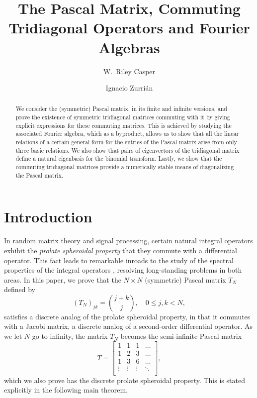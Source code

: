 \documentclass[11pt]{amsart}
\theoremstyle{plain}
\newcommand{\cleqn}{\setcounter{equation}{0}}
\newcommand{\clth}{\setcounter{theorem}{0}}
\newcommand {\sectionnew}[1]{\section{#1}\cleqn\clth}
\theoremstyle{named}
\begin{document}
\title[Pascal Matrix, Commuting Tridiagonal Operators and Fourier Algebras]
{The Pascal Matrix, Commuting Tridiagonal Operators and Fourier Algebras}
\author[W.~Riley Casper]{W.~Riley Casper}
\address{
Department of Mathematics \\
California State University Fullerton \\
Fullerton, CA 92831\\
U.S.A.
}
\author[Ignacio Zurri\'an]{Ignacio Zurri\'an}
\address{
Departamento de Matem\'{a}tica Aplicada II \\
Universidad de Sevilla \\
Seville, Spain
}
\date{}
\begin{abstract}
We consider the (symmetric) Pascal matrix, in its finite and infinite versions, and prove the existence of symmetric tridiagonal matrices commuting with it by giving explicit expressions for these commuting matrices. This is achieved by studying the associated Fourier algebra, which as a byproduct, allows us to show that all the linear relations of a certain general form for the entries of the Pascal matrix arise from only three basic relations.
We also show that pairs of eigenvectors of the tridiagonal matrix define a natural eigenbasis for the binomial transform.
Lastly, we show that the commuting tridiagonal matrices provide a numerically stable means of diagonalizing the Pascal matrix.
\end{abstract}
\maketitle
\sectionnew{Introduction}
In random matrix theory and signal processing, certain natural integral operators exhibit the \emph{prolate spheroidal property} that they commute with a differential operator.
This fact leads to remarkable inroads to the study of the spectral properties of the integral operators \cite{S,SP,TW1,TW2}, resolving long-standing problems in both areas.
In this paper, we prove that the $N\times N$ (symmetric) Pascal matrix $T_N$ defined by
$$(T_N)_{jk} = \binom{j+k}{j},\quad  0\leq j,k < N,$$
satisfies a discrete analog of the prolate spheroidal property, in that it commutes with a Jacobi matrix, a discrete analog of a second-order differential operator.
As we let $N$ go to infinity, the matrix $T_N$ becomes the semi-infinite Pascal matrix 
$$
T = \left[\begin{array}{ccccc}
1 & 1 &  1  & \dots \\
1 &2 & 3 & \dots \\
 1  & 3 & 6 & \dots \\
\vdots & \vdots & \vdots & \ddots\\
\end{array}\right],
$$
which we also prove has the discrete prolate spheroidal property.
This is stated explicitly in the following main theorem.
\end{document}
